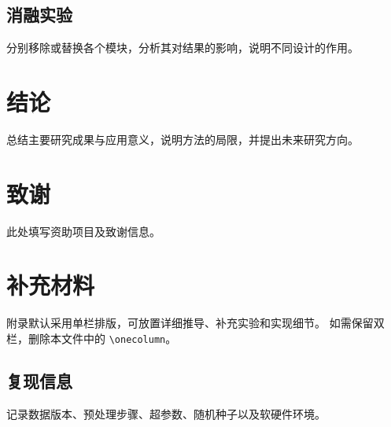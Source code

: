 \documentclass[twocolumn]{paper}
\begin{document}
\subsection{消融实验}
分别移除或替换各个模块，分析其对结果的影响，说明不同设计的作用。

\section{结论}
总结主要研究成果与应用意义，说明方法的局限，并提出未来研究方向。

\section*{致谢}
此处填写资助项目及致谢信息。




\clearpage
\onecolumn
\appendix
\section{补充材料}
\label{app:details}
附录默认采用单栏排版，可放置详细推导、补充实验和实现细节。
如需保留双栏，删除本文件中的 \verb|\onecolumn|。

\subsection{复现信息}
记录数据版本、预处理步骤、超参数、随机种子以及软硬件环境。
\end{document}
